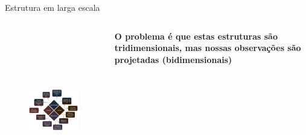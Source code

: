 \begin{frame}[c]{Estrutura em larga escala}
    \begin{columns}[c]
        \begin{column}{0.56\textwidth}
            \begin{figure}
                \centering
                \includegraphics[height=7cm]{images/LSS.png}
            \end{figure}
        \end{column}
        \begin{column}{0.36\textwidth}
            \begin{splusbox}{}
                \textbf{O problema é que estas estruturas são tridimensionais, mas nossas observações são projetadas (bidimensionais)}
            \end{splusbox}
        \end{column}
    \end{columns}
\end{frame}



